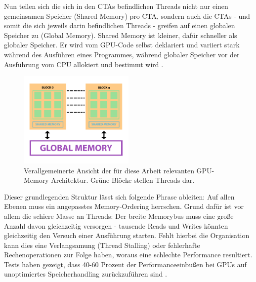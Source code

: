 \documentclass[final,bibliography=totocnumbered]{include/sikseminar}
\begin{document}
Nun teilen sich die sich in den CTAs befindlichen Threads nicht nur einen gemeinsamen Speicher (Shared Memory) pro CTA, sondern auch die CTAs - und somit die sich jeweils darin befindlichen Threads -
greifen auf einen globalen Speicher zu (Global Memory). Shared Memory ist kleiner, dafür schneller als globaler Speicher. Er wird vom GPU-Code selbst deklariert und variiert stark während des Ausführen eines Programmes, 
während globaler Speicher vor der Ausführung vom CPU allokiert und bestimmt wird \cite{gpuhp2}.


\begin{figure}[htbp] %
  \centering
  \includegraphics[width=0.5\textwidth]{figures/gpumemory}
  \caption{Verallgemeinerte Ansicht der für diese Arbeit relevanten GPU-Memory-Architektur. Grüne Blöcke stellen Threads dar.}
  \label{Fig:gpum}
\end{figure}


Dieser grundlegenden Struktur lässt sich folgende Phrase ableiten: Auf allen Ebenen muss ein angepasstes Memory-Ordering herrschen.
Grund dafür ist vor allem die schiere Masse an Threads: Der breite Memorybus muss eine große Anzahl davon gleichzeitig versorgen - tausende Reads und Writes 
könnten gleichzeitig den Versuch einer Ausführung starten. Fehlt hierbei die Organisation kann dies eine Verlangsamung (Thread Stalling) oder fehlerhafte Rechenoperationen zur Folge haben, 
woraus eine schlechte Performance resultiert.
Tests haben gezeigt, dass 40-60 Prozent der Performanceeinbußen bei GPUs auf unoptimiertes Speicherhandling zurückzuführen sind \cite{gpuhp2}. %
\end{document}

